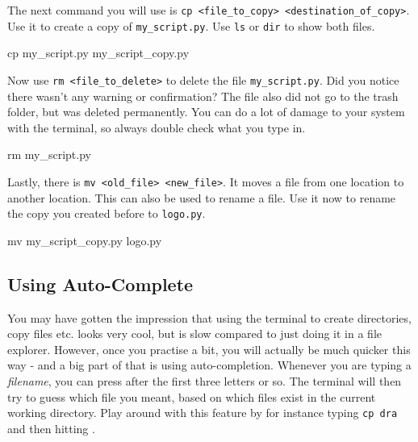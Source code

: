 \vspace{1em}

\noindent The next command you will use is \texttt{cp <file\_to\_copy> <destination\_of\_copy>}. Use it to create a copy of \texttt{my\_script.py}. Use \texttt{ls} or \texttt{dir} to show both files.

\vspace{1em}

\begin{solution}
    \begin{outputcode}
cp my_script.py my_script_copy.py
    \end{outputcode}
\end{solution}

\noindent Now use \texttt{rm <file\_to\_delete>} to delete the file \texttt{my\_script.py}. Did you notice there wasn't any warning or confirmation? The file also did not go to the trash folder, but was deleted permanently. You can do a lot of damage to your system with the terminal, so always double check what you type in.

\vspace{1em}

\begin{solution}
    \begin{outputcode}
rm my_script.py
    \end{outputcode}
\end{solution}

\noindent Lastly, there is \texttt{mv <old\_file> <new\_file>}. It moves a file from one location to another location. This can also be used to rename a file. Use it now to rename the copy you created before to \texttt{logo.py}.

\vspace{1em}

\begin{solution}
    \begin{outputcode}
mv my_script_copy.py logo.py
    \end{outputcode}
\end{solution}

\subsection{Using Auto-Complete}

You may have gotten the impression that using the terminal to create directories, copy files etc. looks very cool, but is slow compared to just doing it in a file explorer. However, once you practise a bit, you will actually be much quicker this way - and a big part of that is using auto-completion. Whenever you are typing a \textit{filename}, you can press \keys{\tab} after the first three letters or so. The terminal will then try to guess which file you meant, based on which files exist in the current working directory. Play around with this feature by for instance typing \texttt{cp dra} and then hitting \keys{\tab}.


